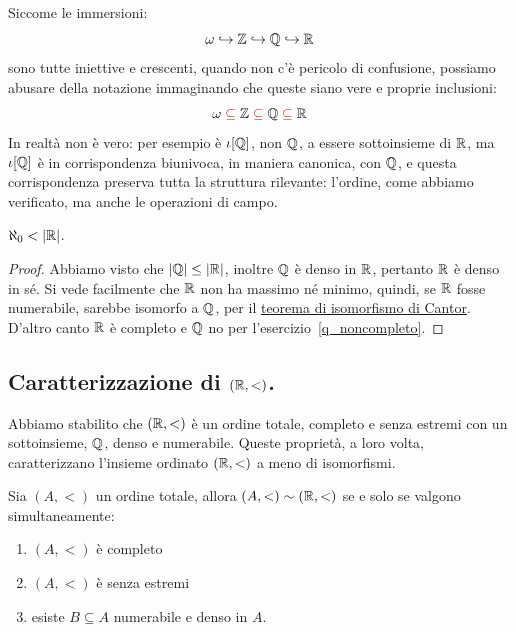 \begin{notation}[Abuso di]
	Siccome le immersioni:
	\[ \omega \hookrightarrow \mathbb Z \hookrightarrow \mathbb Q \hookrightarrow \mathbb R
		\]
	sono tutte iniettive e crescenti, quando non c'\`e pericolo di confusione, possiamo abusare della notazione immaginando che 
	queste siano vere e proprie inclusioni:
	\[ \omega \;{\drkred\subseteq}\; \ZZ \;{\drkred\subseteq} \;\QQ
\;{\drkred\subseteq}\; \RR
		\]
	In realt\`a non \`e vero: per esempio \`e $\iota[\mathbb Q]$, non $\mathbb Q$, a essere sottoinsieme di $\mathbb R$, ma $\iota[\mathbb Q]$ \`e in corrispondenza biunivoca, in maniera 
	canonica, con $\mathbb Q$, e questa corrispondenza preserva tutta la
struttura rilevante: l'ordine, come abbiamo verificato, ma anche le operazioni di campo.
\end{notation}

\begin{corollary}
	$\aleph_0 < |\mathbb R|$.
\end{corollary}

\begin{proof}
	Abbiamo visto che $|\mathbb Q| \leq |\mathbb R|$, inoltre $\mathbb Q$ \`e denso in $\mathbb R$, pertanto 
	$\mathbb R$ \`e denso in s\'e. Si vede facilmente che $\mathbb R$ non ha
massimo n\'e minimo, quindi, se $\mathbb R$ fosse numerabile, sarebbe isomorfo a
$\mathbb Q$, per il \hyperref[isoCantor]{teorema di isomorfismo di Cantor}.
	D'altro canto $\mathbb R$ \`e completo e $\mathbb Q$ no per
l'esercizio~\ref{q_noncompleto}.
\end{proof}

\subsection{Caratterizzazione di $(\RR, <)$.}
Abbiamo stabilito che $(\RR,<)$ \`e un ordine totale, completo e senza estremi con un sottoinsieme, $\mathbb Q$, denso e numerabile.
Queste propriet\`a, a loro volta, caratterizzano l'insieme ordinato $(\RR,<)$ a meno di isomorfismi.

\begin{proposition}[Caratterizzazione di $(\RR,<)$]\label{pro-car-rrr}
	Sia $(A,<)$ un ordine totale, allora $(A,<) \sim (\mathbb R,<)$ se e
solo se valgono simultaneamente:
	\begin{enumerate}[1.]
		\item $(A,<)$ \`e completo
		\item $(A,<)$ \`e senza estremi
		\item esiste $B \subseteq A$ numerabile e denso in $A$.
	\end{enumerate} 
\end{proposition}

